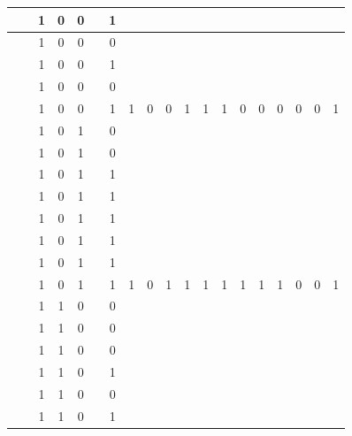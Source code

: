 \begin{table}[!tb]
\begin{tabular}{|c|c|c|c|c|c|c|c|c|c|c|c|c|c|c|c|c|c|c|}
        \rowcolor{yellow!40}  &  & 1 & 0 & 0 &  & 1 &  &  &  &  &  &  &  &  &  &  &  &  \\ \hline
        \rowcolor{yellow!40}  &  & 1 & 0 & 0 &  & 0 &  &  &  &  &  &  &  &  &  &  &  &  \\ \hline
        \rowcolor{yellow!40}  &  & 1 & 0 & 0 &  & 1 &  &  &  &  &  &  &  &  &  &  &  &  \\ \hline
        \rowcolor{yellow!40}  &  & 1 & 0 & 0 &  & 0 &  &  &  &  &  &  &  &  &  &  &  &  \\ \hline
        \rowcolor{yellow!40}  &  & 1 & 0 & 0 &  & 1 & 1 & 0 & 0 & 1 & 1 & 1 & 0 & 0 & 0 & 0 & 0 & 1 \\ \hline
        \rowcolor{gray!40}  &  & 1 & 0 & 1 &  & 0 &  &  &  &  &  &  &  &  &  &  &  &  \\ \hline
        \rowcolor{gray!40}  &  & 1 & 0 & 1 &  & 0 &  &  &  &  &  &  &  &  &  &  &  &  \\ \hline
        \rowcolor{gray!40}  &  & 1 & 0 & 1 &  & 1 &  &  &  &  &  &  &  &  &  &  &  &  \\ \hline
        \rowcolor{gray!40}  &  & 1 & 0 & 1 &  & 1 &  &  &  &  &  &  &  &  &  &  &  &  \\ \hline
        \rowcolor{gray!40}  &  & 1 & 0 & 1 &  & 1 &  &  &  &  &  &  &  &  &  &  &  &  \\ \hline
        \rowcolor{gray!40}  &  & 1 & 0 & 1 &  & 1 &  &  &  &  &  &  &  &  &  &  &  &  \\ \hline
        \rowcolor{gray!40}  &  & 1 & 0 & 1 &  & 1 &  &  &  &  &  &  &  &  &  &  &  &  \\ \hline
        \rowcolor{gray!40}  &  & 1 & 0 & 1 &  & 1 & 1 & 0 & 1 & 1 & 1 & 1 & 1 & 1 & 1 & 0 & 0 & 1 \\ \hline
        \rowcolor{blue!40}  &  & 1 & 1 & 0 &  & 0 &  &  &  &  &  &  &  &  &  &  &  &  \\ \hline
        \rowcolor{blue!40}  &  & 1 & 1 & 0 &  & 0 &  &  &  &  &  &  &  &  &  &  &  &  \\ \hline
        \rowcolor{blue!40}  &  & 1 & 1 & 0 &  & 0 &  &  &  &  &  &  &  &  &  &  &  &  \\ \hline
        \rowcolor{blue!40}  &  & 1 & 1 & 0 &  & 1 &  &  &  &  &  &  &  &  &  &  &  &  \\ \hline
        \rowcolor{blue!40}  &  & 1 & 1 & 0 &  & 0 &  &  &  &  &  &  &  &  &  &  &  &  \\ \hline
        \rowcolor{blue!40}  &  & 1 & 1 & 0 &  & 1 &  &  &  &  &  &  &  &  &  &  &  &  \\ \hline

\end{tabular}
\end{table}
